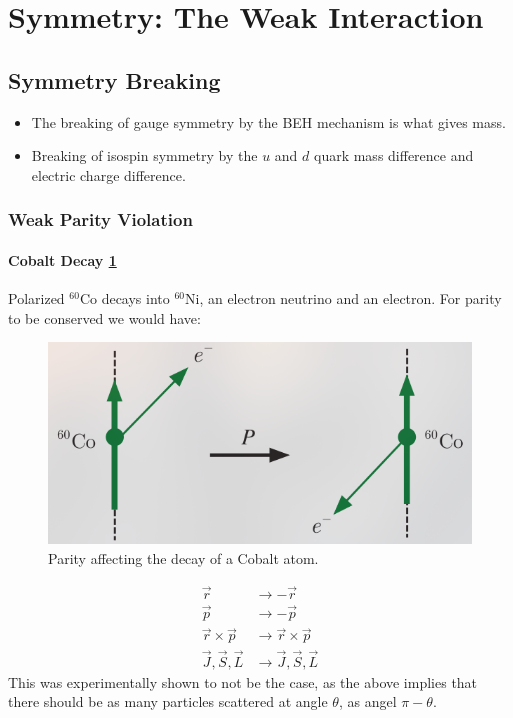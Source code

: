 \section{Symmetry: The Weak Interaction}
\subsection{Symmetry Breaking}
\begin{itemize}
    \item The breaking of gauge symmetry by the BEH mechanism is what gives mass. 
    \item Breaking of isospin symmetry by the $u$ and $d$ quark mass difference and electric charge difference. 
\end{itemize}
\subsubsection{Weak Parity Violation}
\paragraph{Cobalt Decay \cref{fig: cobalt_symmetry_breaking}}
Polarized $^{60}$Co decays into $^{60}$Ni, an electron neutrino and an electron. For parity to be conserved we would have\vbox{:}
\begin{figure}
\centering
\includegraphics[width = .4\textwidth]{cobalt_symmetry_breaking.png}
\caption{Parity affecting the decay of a Cobalt atom.}
\label{fig: cobalt_symmetry_breaking}
\end{figure}
\begin{align}
  \vec{r} &→ -\vec{r} \\
  \vec{p} &→ -\vec{p} \\
  \vec{r} × \vec{p} &→ \vec{r} × \vec{p} \\
  \vec{J}, \vec{S}, \vec{L} &→ \vec{J}, \vec{S}, \vec{L}
\end{align}
This was experimentally shown to not be the case, as the above implies that there should be as many particles scattered at angle $θ$, as angel $π - θ$. 



